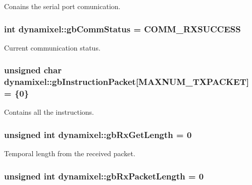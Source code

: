 Conains the serial port comunication. 

\hypertarget{a00004_a5b603f6bed7ccc595f1f50bd6a6ebbfc}{}
\subsubsection[{gb\+Comm\+Status}]{\setlength{\rightskip}{0pt plus 5cm}int dynamixel\+::gb\+Comm\+Status = C\+O\+M\+M\+\_\+\+R\+X\+S\+U\+C\+C\+E\+S\+S\hspace{0.3cm}{\ttfamily [private]}}\label{a00004_a5b603f6bed7ccc595f1f50bd6a6ebbfc}


Current communication status. 

\hypertarget{a00004_afd94dcf01b8e96298727776e222de722}{}
\subsubsection[{gb\+Instruction\+Packet}]{\setlength{\rightskip}{0pt plus 5cm}unsigned char dynamixel\+::gb\+Instruction\+Packet\mbox{[}M\+A\+X\+N\+U\+M\+\_\+\+T\+X\+P\+A\+C\+K\+E\+T\mbox{]} = \{0\}\hspace{0.3cm}{\ttfamily [private]}}\label{a00004_afd94dcf01b8e96298727776e222de722}


Contains all the instructions. 

\hypertarget{a00004_a9d590ce24791d111c2db9b66be1e046d}{}
\subsubsection[{gb\+Rx\+Get\+Length}]{\setlength{\rightskip}{0pt plus 5cm}unsigned int dynamixel\+::gb\+Rx\+Get\+Length = 0\hspace{0.3cm}{\ttfamily [private]}}\label{a00004_a9d590ce24791d111c2db9b66be1e046d}


Temporal length from the received packet. 

\hypertarget{a00004_a333686e1b5903d16c41df8172b6bd5a8}{}
\subsubsection[{gb\+Rx\+Packet\+Length}]{\setlength{\rightskip}{0pt plus 5cm}unsigned int dynamixel\+::gb\+Rx\+Packet\+Length = 0\hspace{0.3cm}{\ttfamily [private]}}\label{a00004_a333686e1b5903d16c41df8172b6bd5a8}


